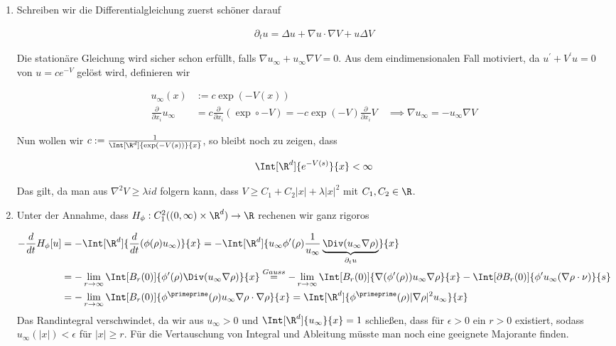
\begin{solution}

\phantom{}
\begin{enumerate}[label = (\roman*)]
  \item Schreiben wir die Differentialgleichung zuerst schöner darauf

  \begin{align*}
    \partial_t u
    =
    \Delta u + \nabla u \cdot \nabla V + u \Delta V
  \end{align*}

  Die stationäre Gleichung wird sicher schon erfüllt, falls $\nabla u_\infty + u_\infty \nabla V = 0$. Aus dem eindimensionalen Fall motiviert, da $u^\prime + V^\prime u = 0$ von $u = ce^{-V}$ gelöst wird, definieren wir

  \begin{align*}
    u_\infty(x)
    &:=
    c \exp(-V(x)) \\
    \frac{\partial}{\partial x_i} u_\infty
    &=
    c \frac{\partial}{\partial x_i} (\exp \circ -V)
    =
    - c \exp(-V) \frac{\partial}{\partial x_i} V
    \quad
    \implies
    \nabla u_\infty
    =
    -u_\infty \nabla V
  \end{align*}

  Nun wollen wir $c := \frac{1}{\Int[\R^d]{ \exp(-V(s))}{x}}$, so bleibt noch zu zeigen, dass

  \begin{align*}
    \Int[\R^d] {e^{-V(s)}}{x} < \infty
  \end{align*}

  Das gilt, da man aus $\nabla^2V \geq \lambda id$ folgern kann, dass $V \geq C_1 + C_2|x| + \lambda |x|^2$ mit $C_1, C_2 \in \R$.
  \item Unter der Annahme, dass $H_\phi: C^2_1((0,\infty) \times \R^d) \rightarrow \R$ rechenen wir ganz rigoros

  \begin{align*}
    -\frac{d}{dt} H_\phi[u]
    &=
    -\Int[\R^d]{ \frac{d}{dt}(\phi(\rho)u_\infty)}{x}
    =
    -\Int[\R^d]{u_\infty \phi^\prime(\rho)\frac{1}{u_\infty} \underbrace{\Div(u_\infty \nabla \rho)}_{\partial_t u}}{x} \\
    &=
    -\lim_{r \rightarrow \infty} \Int[B_r(0)]{\phi^\prime(\rho) \Div(u_\infty \nabla \rho)}{x}
    \stackrel{Gauss}{=}
    -\lim_{r \rightarrow \infty} \Int[B_r(0)]{\nabla(\phi^\prime(\rho)) u_\infty \nabla \rho}{x}
    -
    \Int[\partial B_r(0)]{\phi^\prime u_\infty (\nabla \rho \cdot \nu)}{s} \\
    &=
    -\lim_{r \rightarrow \infty} \Int[B_r(0)]{\phi^\primeprime(\rho) u_\infty \nabla \rho \cdot \nabla \rho}{x}
    =
    \Int[\R^d]{\phi^\primeprime(\rho) |\nabla \rho|^2 u_\infty}{x}
  \end{align*}
  Das Randintegral verschwindet, da wir aus $u_\infty > 0$ und $\Int[\R^d]{u_\infty}{x} = 1$ schließen, dass für $\epsilon > 0$ ein $r > 0$ existiert, sodass $u_\infty(|x|) < \epsilon$ für $|x| \geq r$. Für die Vertauschung von Integral und Ableitung müsste man noch eine geeignete Majorante finden.


\end{enumerate}
\end{solution}
